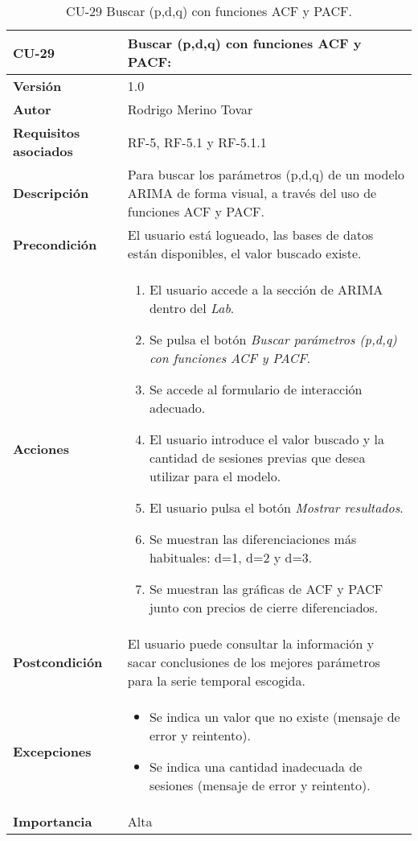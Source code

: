 \begin{table}[p]
	\centering
	\begin{tabularx}{\linewidth}{ p{} p{} }
		\toprule
		\textbf{CU-29}    & \textbf{Buscar (p,d,q) con funciones ACF y PACF:}\\
		\toprule
		\textbf{Versión}              & 1.0    \\
		\textbf{Autor}                & Rodrigo Merino Tovar \\
		\textbf{Requisitos asociados} & RF-5, RF-5.1 y RF-5.1.1  \\
		\textbf{Descripción}          & Para buscar los parámetros (p,d,q) de un modelo ARIMA de forma visual, a través del uso de funciones ACF y PACF.\\
		\textbf{Precondición}         & El usuario está logueado, las bases de datos están disponibles, el valor buscado existe.  \\
		\textbf{Acciones}             &
		\begin{enumerate}
			\def\labelenumi{\arabic{enumi}.}
			\tightlist 
			\item El usuario accede a la sección de ARIMA dentro del \emph{Lab}.
			\item Se pulsa el botón \emph{Buscar parámetros (p,d,q) con funciones ACF y PACF}. 
			\item Se accede al formulario de interacción adecuado. 
			\item El usuario introduce el valor buscado y la cantidad de sesiones previas que desea utilizar para el modelo. 
			\item El usuario pulsa el botón \emph{Mostrar resultados}.
			\item Se muestran las diferenciaciones más habituales: d=1, d=2 y d=3.			
			\item Se muestran las gráficas de ACF y PACF junto con precios de cierre diferenciados.
		\end{enumerate}\\
		\textbf{Postcondición}        & El usuario puede consultar la información y sacar conclusiones de los mejores parámetros para la serie temporal escogida. \\
		\textbf{Excepciones}          & 
		\begin{itemize}
			\tightlist
			\item Se indica un valor que no existe (mensaje de error y reintento).
			\item Se indica una cantidad inadecuada de sesiones (mensaje de error y reintento).
		\end{itemize} \\
		\textbf{Importancia}          & Alta \\
		\bottomrule
	\end{tabularx}
	\caption{CU-29 Buscar (p,d,q) con funciones ACF y PACF.}
\end{table}


